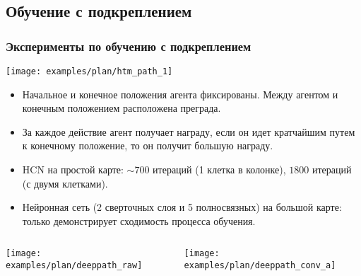 \documentclass[default]{beamer}
\begin{document}
	\subsection{Обучение с подкреплением}
	\begin{frame}
		\frametitle{Эксперименты по обучению с подкреплением}
		\footnotesize
		\centering
		\texttt{[image: examples/plan/htm\_path\_1]}
		
		\begin{itemize}
			\item Начальное и конечное положения агента фиксированы. Между агентом и конечным положением расположена преграда.
			\item За каждое действие агент получает награду, если он идет кратчайшим путем к конечному положение, то он получит большую награду. 
			\item HCN на простой карте: $\sim 700$ итераций (1 клетка в колонке), $1800$ итераций (с двумя клетками).
			\item Нейронная сеть (2 сверточных слоя и 5 полносвязных) на большой карте: только демонстрирует сходимость процесса обучения. 
		\end{itemize}
		\vspace{-5pt}
		\begin{columns}
			\begin{column}{0.5\textwidth}
				\centering
				\texttt{[image: examples/plan/deeppath\_raw]}
			\end{column}
			\begin{column}{0.5\textwidth}
				\centering
				\texttt{[image: examples/plan/deeppath\_conv\_a]}
			\end{column}
		\end{columns}
	
	\end{frame}	
\end{document}
